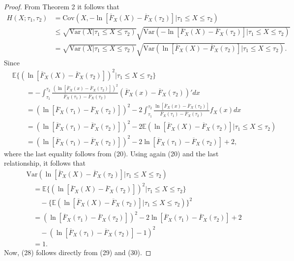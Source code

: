\documentclass[11pt]{article}
\begin{document}
\begin{proof}
	From Theorem 2 it follows that
	\begin{align}
		H(X;\tau_1,\tau_2 ) & =  \textstyle\mathrm{Cov}(X,-\ln[\overline{F}_X (X)-\overline{F}_X (\tau_2)]|\tau_1 \leq X\leq \tau_2 ) \nonumber \\
		&  \textstyle \leq \sqrt{\mathrm{Var}(X|\tau_1 \leq X\leq \tau_2)} \sqrt{\mathrm{Var}(-\ln[\overline{F}_X (X)-\overline{F}_X (\tau_2)]|\tau_1 \leq X\leq \tau_2 )} \nonumber \\
		& =  \textstyle \sqrt{\mathrm{Var}(X|\tau_1 \leq X\leq \tau_2)} \sqrt{\mathrm{Var}(\ln[\overline{F}_X (X)-\overline{F}_X (\tau_2)]|\tau_1 \leq X\leq \tau_2 )}.
	\end{align}
	Since
	\begin{align*}
		&  \textstyle\mathbb{E}\{(\ln[\overline{F}_X (X)-\overline{F}_X (\tau_2)])^2 |\tau_1 \leq X\leq \tau_2 \} \\
		&  \textstyle\qquad = -\int_{\tau_1}^{\tau_2} \frac{(\ln[\overline{F}_X (x)-\overline{F}_X (\tau_2)])^2}{\overline{F}_X (\tau_1 )-\overline{F}_X (\tau_2 )} \left( \overline{F}_X (x)-\overline{F}_X (\tau_2 ) \right)' dx \\
		&  \textstyle\qquad = (\ln[\overline{F}_X (\tau_1 )-\overline{F}_X (\tau_2)])^2 -2 \int_{\tau_1}^{\tau_2} \frac{\ln[\overline{F}_X (x)-\overline{F}_X (\tau_2 )]}{\overline{F}_X (\tau_1 )-\overline{F}_X (\tau_2 )} f_X (x)dx \\
		&  \textstyle\qquad = (\ln[\overline{F}_X (\tau_1 )-\overline{F}_X (\tau_2)])^2 -2\mathbb{E}(\ln[\overline{F}_X (X)-\overline{F}_X (\tau_2)]|\tau_1 \leq X\leq \tau_2 ) \\
		&  \textstyle \qquad = (\ln[\overline{F}_X (\tau_1 )-\overline{F}_X (\tau_2)])^2 -2\ln[\overline{F}_X (\tau_1 )-\overline{F}_X (\tau_2)]+2,
	\end{align*}
	where the last equality follows from (20). Using again (20) and the last relationship, it follows that
	\begin{align}
		& \quad \mathrm{Var}(\ln[\overline{F}_X (X)-\overline{F}_X (\tau_2)]|\tau_1 \leq X\leq \tau_2 ) \nonumber \\
		& \qquad = \mathbb{E}\{(\ln[\overline{F}_X (X)-\overline{F}_X (\tau_2)])^2 |\tau_1 \leq X\leq \tau_2 \} \nonumber \\
		& \qquad \quad -\{\mathbb{E}(\ln[\overline{F}_X (X)-\overline{F}_X (\tau_2)]|\tau_1 \leq X\leq \tau_2 )\}^2 \nonumber \\
		& \qquad = (\ln[\overline{F}_X (\tau_1 )-\overline{F}_X (\tau_2)])^2 -2\ln[\overline{F}_X (\tau_1 )-\overline{F}_X (\tau_2)]+2 \nonumber \\
		& \qquad \quad -(\ln[\overline{F}_X (\tau_1 )-\overline{F}_X (\tau_2)]-1)^2 \nonumber \\
		& \qquad = 1.
	\end{align}
	Now, (28) follows directly from (29) and (30).
\end{proof}
\end{document}
